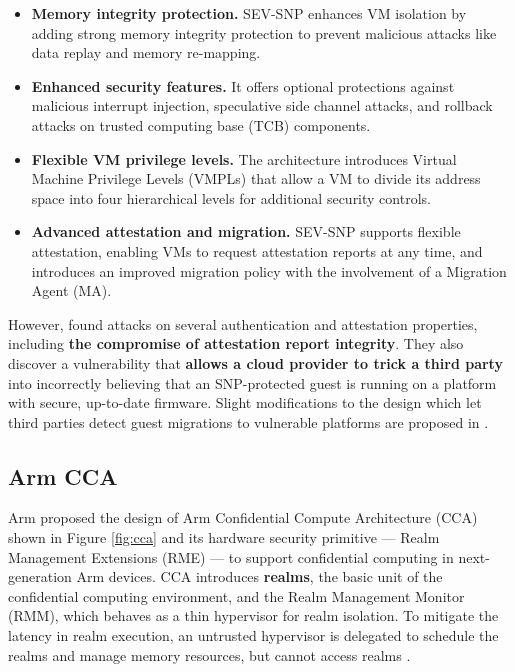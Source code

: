 \documentclass[lang=en]{sjtuarticle}
\begin{document}
\begin{itemize}
    \item 
    \textbf{Memory integrity protection.} SEV-SNP enhances VM isolation by adding strong memory integrity protection to prevent malicious attacks like data replay and memory re-mapping.
    
    \item \textbf{Enhanced security features.} It offers optional protections against malicious interrupt injection, speculative side channel attacks, and rollback attacks on trusted computing base (TCB) components.
    
    \item \textbf{Flexible VM privilege levels.} The architecture introduces Virtual Machine Privilege Levels (VMPLs) that allow a VM to divide its address space into four hierarchical levels for additional security controls.
    
    \item \textbf{Advanced attestation and migration.} SEV-SNP supports flexible attestation, enabling VMs to request attestation reports at any time, and introduces an improved migration policy with the involvement of a Migration Agent (MA).
\end{itemize}

However, \citeauthor*{paradvzik2024formal} found attacks on several authentication and attestation properties, including \textbf{the compromise of attestation report integrity}. They also discover a vulnerability that \textbf{allows a cloud provider to trick a third party} into incorrectly believing that an SNP-protected guest is running on a platform with secure, up-to-date firmware. Slight modifications to the design which let third parties detect guest migrations to vulnerable platforms are proposed in \cite{paradvzik2024formal}.

\subsection{Arm CCA}

Arm proposed the design of Arm Confidential Compute
Architecture (CCA) \cite{cca} shown in Figure \ref{fig:cca} and its hardware security
primitive --- Realm Management Extensions (RME) --- to
support confidential computing in next-generation Arm
devices. CCA introduces \textbf{realms}, the basic unit of the confidential
computing environment, and the Realm Management
Monitor (RMM), which behaves as a thin hypervisor for
realm isolation. To mitigate the latency in realm execution,
an untrusted hypervisor is delegated to schedule the realms
and manage memory resources, but cannot access realms \cite{wang2024cage}.
\end{document}

